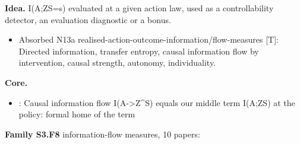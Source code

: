 \documentclass[10pt]{article}
\newcommand{\memb}[1]{\par\smallskip\textbf{#1}\quad}
\begin{document}
\textbf{Idea.} I(A;Z\textbar{}S=s) evaluated at a given action law, used as a controllability detector, an evaluation diagnostic or a bonus.
\begin{itemize}[nosep,leftmargin=1.2em]
\item Absorbed N13a realised-action-outcome-information/flow-measures [T]: Directed information, transfer entropy, causal information flow by intervention, causal strength, autonomy, individuality.
\end{itemize}


\memb{Core.}
\begin{itemize}[nosep,leftmargin=1.2em]
\item \citet{Ay-information08}: Causal information flow I(A-\textgreater{}Z\textbar{}\^{}S) equals our middle term I(A;Z\textbar{}S) at the policy: formal home of the term
\end{itemize}
\memb{Family S3.F8} information-flow measures, 10 papers: {\footnotesize \citetext{\citealp{Ay-information08}; \citealp{Massey-causality90}; \citealp{Schreiber-measuring00}; \citealp{Lungarella-mapping06}; \citealp{Klyubin-representations07}; \citealp{Bertschinger-autonomy08}\dag; \citealp{Janzing-quantifying13}; \citealp{Krakauer-information20}; \citealp{Lozano-Duran-information21}; \citealp{Klyubin-organization04}}}
\end{document}
